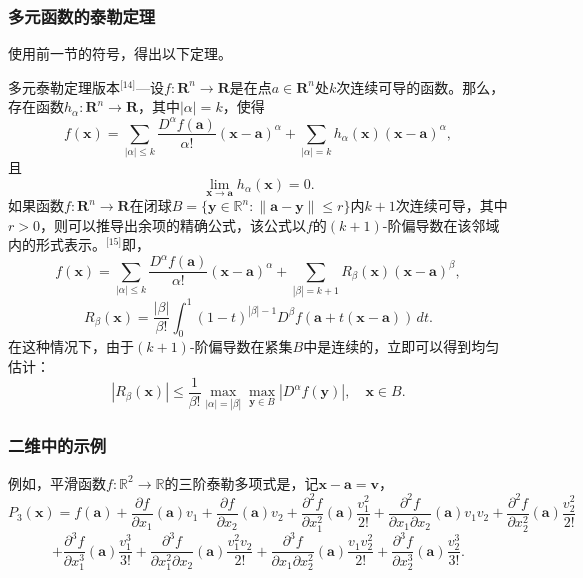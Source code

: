 \subsubsection{多元函数的泰勒定理}  
使用前一节的符号，得出以下定理。

多元泰勒定理版本\(^\text{[14]}\)—设\( f : \mathbf{R}^n \to \mathbf{R} \)是在点\( a \in \mathbf{R}^n \)处\( k \)次连续可导的函数。那么，存在函数\( h_\alpha : \mathbf{R}^n \to \mathbf{R} \)，其中\( |\alpha| = k \)，使得
\[
f(\mathbf{x}) = \sum_{|\alpha| \leq k} \frac{D^\alpha f(\mathbf{a})}{\alpha!} (\mathbf{x} - \mathbf{a})^\alpha + \sum_{|\alpha| = k} h_\alpha(\mathbf{x}) (\mathbf{x} - \mathbf{a})^\alpha,~
\]
且
\[
\lim_{\mathbf{x} \to \mathbf{a}} h_\alpha(\mathbf{x}) = 0.~
\]
如果函数\( f : \mathbf{R}^n \to \mathbf{R} \)在闭球\( B = \{ \mathbf{y} \in \mathbb{R}^n : \|\mathbf{a} - \mathbf{y}\| \leq r \} \)内\( k + 1 \)次连续可导，其中 \( r > 0 \)，则可以推导出余项的精确公式，该公式以\( f \)的\( (k+1) \)-阶偏导数在该邻域内的形式表示。\(^\text{[15]}\)即，
\[
f(\mathbf{x}) = \sum_{|\alpha| \leq k} \frac{D^\alpha f(\mathbf{a})}{\alpha!} (\mathbf{x} - \mathbf{a})^\alpha + \sum_{|\beta| = k+1} R_\beta(\mathbf{x}) (\mathbf{x} - \mathbf{a})^\beta,~
\]
\[
R_\beta(\mathbf{x}) = \frac{|\beta|}{\beta!} \int_0^1 (1 - t)^{|\beta| - 1} D^\beta f\left( \mathbf{a} + t (\mathbf{x} - \mathbf{a}) \right) \, dt.~
\]
在这种情况下，由于\( (k+1) \)-阶偏导数在紧集\( B \)中是连续的，立即可以得到均匀估计：
\[
|R_\beta(\mathbf{x})| \leq \frac{1}{\beta!} \max_{|\alpha| = |\beta|} \max_{\mathbf{y} \in B} |D^\alpha f(\mathbf{y})|, \quad \mathbf{x} \in B.~
\]
\subsubsection{二维中的示例}  
例如，平滑函数\( f : \mathbb{R}^2 \to \mathbb{R} \)的三阶泰勒多项式是，记\(\mathbf{x} - \mathbf{a} = \mathbf{v} \)，
\[
P_3(\mathbf{x}) = f(\mathbf{a}) + \frac{\partial f}{\partial x_1}(\mathbf{a}) v_1 + \frac{\partial f}{\partial x_2}(\mathbf{a}) v_2 + \frac{\partial^2 f}{\partial x_1^2}(\mathbf{a}) \frac{v_1^2}{2!} + \frac{\partial^2 f}{\partial x_1 \partial x_2}(\mathbf{a}) v_1 v_2 + \frac{\partial^2 f}{\partial x_2^2}(\mathbf{a}) \frac{v_2^2}{2!} ~
\]
\[
+ \frac{\partial^3 f}{\partial x_1^3}(\mathbf{a}) \frac{v_1^3}{3!} + \frac{\partial^3 f}{\partial x_1^2 \partial x_2}(\mathbf{a}) \frac{v_1^2 v_2}{2!} + \frac{\partial^3 f}{\partial x_1 \partial x_2^2}(\mathbf{a}) \frac{v_1 v_2^2}{2!} + \frac{\partial^3 f}{\partial x_2^3}(\mathbf{a}) \frac{v_2^3}{3!}.~
\]